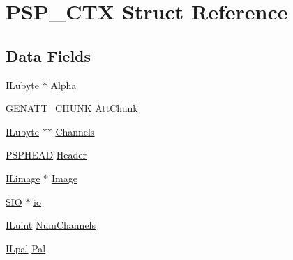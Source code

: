 \hypertarget{struct_p_s_p___c_t_x}{\section{P\-S\-P\-\_\-\-C\-T\-X Struct Reference}
\label{struct_p_s_p___c_t_x}
}
\subsection*{Data Fields}
\begin{DoxyCompactItemize}
\item 
\hyperlink{il_8h_a8d2f04500100a86d1b00e98ab1b15a33}{I\-Lubyte} $\ast$ \hyperlink{struct_p_s_p___c_t_x_a1beaa8d455f9a09cb00ced6cc7bfa303}{Alpha}
\item 
\hyperlink{struct_g_e_n_a_t_t___c_h_u_n_k}{G\-E\-N\-A\-T\-T\-\_\-\-C\-H\-U\-N\-K} \hyperlink{struct_p_s_p___c_t_x_ac9d584d8cd63e0fe550b8a852a8158c9}{Att\-Chunk}
\item 
\hyperlink{il_8h_a8d2f04500100a86d1b00e98ab1b15a33}{I\-Lubyte} $\ast$$\ast$ \hyperlink{struct_p_s_p___c_t_x_a501cc40f92f4e446735553a292a735fa}{Channels}
\item 
\hyperlink{struct_p_s_p_h_e_a_d}{P\-S\-P\-H\-E\-A\-D} \hyperlink{struct_p_s_p___c_t_x_a9a4ba7ee853a2e3e9b9e785d93dc2337}{Header}
\item 
\hyperlink{struct_i_limage}{I\-Limage} $\ast$ \hyperlink{struct_p_s_p___c_t_x_a3886f625b62940075991f33d913127d0}{Image}
\item 
\hyperlink{struct_s_i_o}{S\-I\-O} $\ast$ \hyperlink{struct_p_s_p___c_t_x_ab6115e5993ca62edfb3a32ef981294c5}{io}
\item 
\hyperlink{il_8h_ac6508d0e9c19e32f32e00d54b5b8cf30}{I\-Luint} \hyperlink{struct_p_s_p___c_t_x_a425822f038f4742108b502daa6747052}{Num\-Channels}
\item 
\hyperlink{struct_i_lpal}{I\-Lpal} \hyperlink{struct_p_s_p___c_t_x_a689bdcea4bd95419044f5d0bd992dc3b}{Pal}
\end{DoxyCompactItemize}


